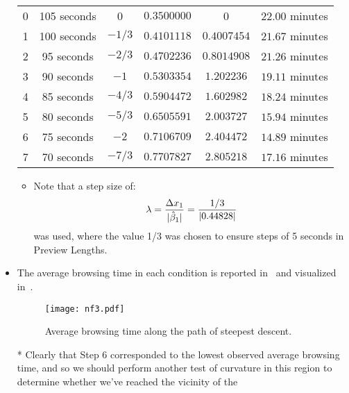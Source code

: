 \begin{itemize}
\begin{table}[!htbp]
\begin{tabular}{cccccc}
                        \midrule 0    & 105 seconds    & 0        & $0.3500000$  & 0           & $22.00$ minutes       \\
                        1             & 100 seconds    & $-1 / 3$ & $0.4101118$  & $0.4007454$ & $21.67$ minutes       \\
                        2             & 95 seconds     & $-2 / 3$ & $0.4702236$  & $0.8014908$ & $21.26$ minutes       \\
                        3             & 90 seconds     & $-1$     & $0.5303354$  & $1.202236$  & $19.11$ minutes       \\
                        4             & 85 seconds     & $-4 / 3$ & $0.5904472$  & $1.602982$  & $18.24$ minutes       \\
                        5             & 80 seconds     & $-5 / 3$ & $0.6505591$  & $2.003727$  & $15.94$ minutes       \\
                        6             & 75 seconds     & $-2$     & $0.7106709$  & $2.404472$  & $14.89$ minutes       \\
                        7             & 70 seconds     & $-7 / 3$ & $0.7707827$  & $2.805218$  & $17.16$ minutes       \\
                        \bottomrule
                  \end{tabular}
            \end{table}
            \begin{itemize}
                  \item Note that a step size of:
                        \[ \lambda=\frac{\Delta x_1}{\lvert\hat{\beta}_1\rvert}=\frac{1/3}{\lvert0.44828\rvert}  \]
                        was used, where the value 1/3 was chosen to ensure steps of 5 seconds in Preview Lengths.
            \end{itemize}
      \item The average browsing time in each condition is reported in~ and visualized in~.
            \begin{figure}[!htbp]
                  \centering
                  \texttt{[image: nf3.pdf]}
                  \caption{Average browsing time along the path of steepest descent.}\label{fig:nf3}
            \end{figure}
      \item[*] Clearly that Step 6 corresponded to the lowest observed average browsing time, and so we should
            perform another test of curvature in this region to determine whether we’ve reached the vicinity of the

\end{itemize}
